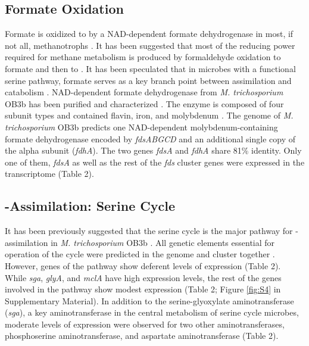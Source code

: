 \subsection{Formate Oxidation}
Formate is oxidized to  by a NAD-dependent formate dehydrogenase in most, if not all, methanotrophs \cite{anthony1982}.
It has been suggested that most of the reducing power required for methane metabolism is produced by formaldehyde oxidation to formate and then to  \cite{hanson1996}.
It has been speculated that in microbes with a functional serine pathway, formate serves as a key branch point between assimilation and catabolism \cite{chistoserdova2011}.
NAD-dependent formate dehydrogenase from \textit{M. trichosporium} OB3b has been purified and characterized \cite{jollie1991}.
The enzyme is composed of four subunit types and contained flavin, iron, and molybdenum \cite{jollie1991}.
The genome of \textit{M. trichosporium} OB3b predicts one NAD-dependent molybdenum-containing formate dehydrogenase encoded by \textit{fdsABGCD} and an additional single copy of the alpha subunit (\textit{fdhA}).
The two genes \textit{fdsA} and \textit{fdhA} share 81\% identity.
Only one of them, \textit{fdsA} as well as the rest of the \textit{fds} cluster genes were expressed in the transcriptome (Table 2).

\subsection{-Assimilation: Serine Cycle}
It has been previously suggested that the serine cycle is the major pathway for -assimilation in \textit{M. trichosporium} OB3b \cite{strom1974}.
All genetic elements essential for operation of the cycle were predicted in the genome and cluster together \cite{stein2010}.
However, genes of the pathway show deferent levels of expression (Table 2).
While \textit{sga}, \textit{glyA}, and \textit{mclA} have high expression levels, the rest of the genes involved in the pathway show modest expression (Table 2; Figure \ref{fig:S4} in Supplementary Material).
In addition to the serine-glyoxylate aminotransferase (\textit{sga}), a key aminotransferase in the central metabolism of serine cycle microbes, moderate levels of expression were observed for two other aminotransferases, phosphoserine aminotransferase, and aspartate aminotransferase (Table 2).

